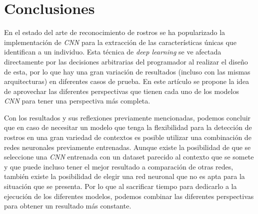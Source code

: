 \documentclass[letterpaper, 10 pt, conference]{ieeeconf}  %
\begin{document}


    \section{Conclusiones}
    En el estado del arte de reconocimiento de rostros se ha popularizado la implementación de
    \textit{CNN} para la extracción de las características únicas que identifican a un individuo.
    Esta técnica de \textit{deep learning} se ve afectada directamente por las decisiones
    arbitrarias del programador al realizar el diseño de esta, por lo que hay una gran variación
    de resultados (incluso con las mismas arquitecturas) en diferentes casos de prueba. En este
    artículo se propone la idea de aprovechar las diferentes perspectivas que tienen cada uno de
    los modelos \textit{CNN} para tener una perspectiva más completa.

    Con los resultados y sus reflexiones previamente mencionadas, podemos concluir que en caso de
    necesitar un modelo que tenga la flexibilidad para la detección de rostros en una gran
    variedad de contextos es posible utilizar una combinación de redes neuronales previamente
    entrenadas. Aunque existe la posibilidad de que se seleccione una \textit{CNN} entrenada
    con un dataset parecido al contexto que se somete y que puede incluso tener el mejor resultado
    a comparación de otras redes, también existe la posibilidad de elegir una red neuronal que
    no es apta para la situación que se presenta. Por lo que al sacrificar tiempo para dedicarlo a
    la ejecución de los diferentes modelos, podemos combinar las diferentes perspectivas para
    obtener un resultado más constante.
\end{document}
